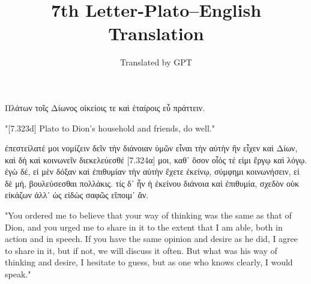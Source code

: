 \documentclass[12pt]{book}
\begin{document}
\title{7th Letter-Plato--English Translation}
\date{}
\author{Translated by GPT}

\maketitle\begin{pairs}
\begin{Rightside}
\begin{Ancient Greek}
\beginnumbering
\pstart
[7.323δ] Πλάτων τοῖς Δίωνος οἰκείοις τε καὶ ἑταίροις εὖ πράττειν.
\pend
\endnumbering
\end{Ancient Greek}
\end{Rightside}
\begin{Leftside}
\begin{English}
\beginnumbering
\pstart
"[7.323d] Plato to Dion's household and friends, do well."
\pend
\endnumbering
\end{English}
\end{Leftside}
\end{pairs}
\Columns
\begin{pairs}
\begin{Rightside}
\begin{Ancient Greek}
\beginnumbering
\pstart
ἐπεστείλατέ μοι νομίζειν δεῖν τὴν διάνοιαν ὑμῶν εἶναι τὴν αὐτὴν ἣν εἶχεν καὶ Δίων, καὶ δὴ καὶ κοινωνεῖν διεκελεύεσθέ [7.324α] μοι, καθ᾽ ὅσον οἷός τέ εἰμι ἔργῳ καὶ λόγῳ. ἐγὼ δέ, εἰ μὲν δόξαν καὶ ἐπιθυμίαν τὴν αὐτὴν ἔχετε ἐκείνῳ, σύμφημι κοινωνήσειν, εἰ δὲ μή, βουλεύσεσθαι πολλάκις. τίς δ᾽ ἦν ἡ ἐκείνου διάνοια καὶ ἐπιθυμία, σχεδὸν οὐκ εἰκάζων ἀλλ᾽ ὡς εἰδὼς σαφῶς εἴποιμ᾽ ἄν.	
\pend
\endnumbering
\end{Ancient Greek}
\end{Rightside}
\begin{Leftside}
\begin{English}
\beginnumbering
\pstart
"You ordered me to believe that your way of thinking was the same as that of Dion, and you urged me to share in it to the extent that I am able, both in action and in speech. If you have the same opinion and desire as he did, I agree to share in it, but if not, we will discuss it often. But what was his way of thinking and desire, I hesitate to guess, but as one who knows clearly, I would speak."
\pend
\endnumbering
\end{English}
\end{Leftside}
\end{pairs}
\Columns
\end{document}
